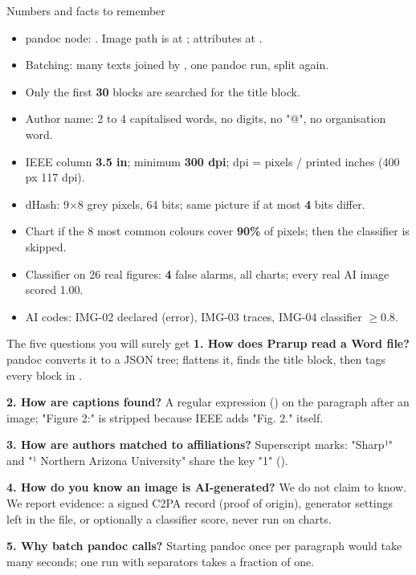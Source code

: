 \begin{cheat}{Numbers and facts to remember}
\begin{itemize}
\item pandoc node: . Image path is at ; attributes at .
\item Batching: many texts joined by , one pandoc run, split again.
\item Only the first \textbf{30} blocks are searched for the title block.
\item Author name: 2 to 4 capitalised words, no digits, no "@", no organisation word.
\item IEEE column \textbf{3.5 in}; minimum \textbf{300 dpi}; dpi = pixels / printed inches (400 px \textrightarrow{} 117 dpi).
\item dHash: 9\(\times\)8 grey pixels, 64 bits; same picture if at most \textbf{4} bits differ.
\item Chart if the 8 most common colours cover \textbf{90\%} of pixels; then the classifier is skipped.
\item Classifier on 26 real figures: \textbf{4} false alarms, all charts; every real AI image scored 1.00.
\item AI codes: IMG-02 declared (error), IMG-03 traces, IMG-04 classifier \(\geq 0.8\).
\end{itemize}
\end{cheat}

\begin{cheat}{The five questions you will surely get}
\textbf{1. How does Prarup read a Word file?} pandoc converts it to a JSON tree;  flattens it, finds the title block, then tags every block in .\par
\textbf{2. How are captions found?} A regular expression () on the paragraph after an image; "Figure 2:" is stripped because IEEE adds "Fig. 2." itself.\par
\textbf{3. How are authors matched to affiliations?} Superscript marks: "Sharp¹" and "¹ Northern Arizona University" share the key "1" ().\par
\textbf{4. How do you know an image is AI-generated?} We do not claim to know. We report evidence: a signed C2PA record (proof of origin), generator settings left in the file, or optionally a classifier score, never run on charts.\par
\textbf{5. Why batch pandoc calls?} Starting pandoc once per paragraph would take many seconds; one run with separators takes a fraction of one.
\end{cheat}
